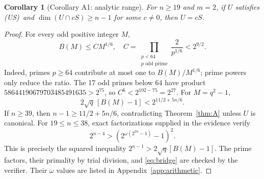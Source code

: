\documentclass[11pt,a4paper]{article}
\newtheorem{corollary}[theorem]{Corollary}
\theoremstyle{definition}\newtheorem{definition}[theorem]{Definition}
\theoremstyle{remark}\newtheorem{remark}[theorem]{Remark}
\newcommand{\US}{\textup{(US)}}
\numberwithin{equation}{section}
\begin{document}
\begin{corollary}[Corollary A1: analytic range]\label{cor:A1}
For $n\ge19$ and $m=2$, if $U$ satisfies \US\ and $\dim(U\cap cS)\ge n-1$ for some $c\ne0$, then $U=cS$.
\end{corollary}
\begin{proof}
For every odd positive integer $M$,
\[
B(M)\le CM^{1/6},\quad
C=\prod_{\substack{p<64\\p\text{ odd prime}}}\frac2{p^{1/6}}<2^{9/2}.
\]
Indeed, primes $p\ge64$ contribute at most one to $B(M)/M^{1/6}$; prime powers only reduce the ratio. The 17 odd primes below 64 have product $58644190679703485491635>2^{75}$, so $C^6<2^{102-75}=2^{27}$. For $M=q^2-1$,
\[
2\sqrt q\,[B(M)-1]<2^{11/2+5n/6}.
\]
If $n\ge39$, then $n-1\ge11/2+5n/6$, contradicting Theorem~\ref{thm:A} unless $U$ is canonical. For $19\le n\le38$, exact factorizations supplied in the evidence verify
\begin{equation}\label{eq:bridge}
2^{n-4}>(2^{\omega(2^{2n}-1)}-1)^2.
\end{equation}
This is precisely the squared inequality $2^{n-1}>2\sqrt q[B(M)-1]$. The prime factors, their primality by trial division, and \eqref{eq:bridge} are checked by the verifier. Their $\omega$ values are listed in Appendix~\ref{app:arithmetic}.
\end{proof}
\end{document}
